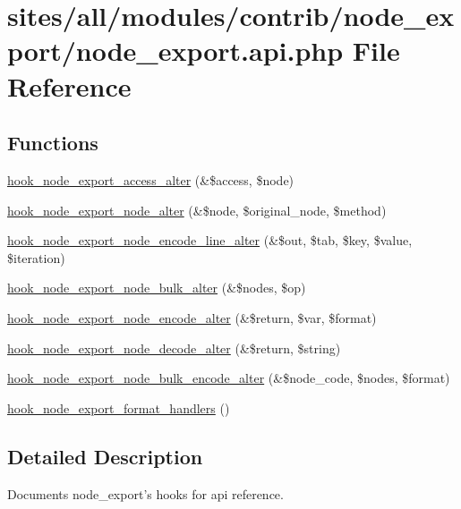 \hypertarget{node__export_8api_8php}{
\section{sites/all/modules/contrib/node\_\-export/node\_\-export.api.php File Reference}
\label{node__export_8api_8php}
}
\subsection*{Functions}
\begin{CompactItemize}
\item 
\hyperlink{node__export_8api_8php_07d300b1b84f51c8194ae2df7df69998}{hook\_\-node\_\-export\_\-access\_\-alter} (\&\$access, \$node)
\item 
\hyperlink{node__export_8api_8php_02844b873762538790439bc217d6e5de}{hook\_\-node\_\-export\_\-node\_\-alter} (\&\$node, \$original\_\-node, \$method)
\item 
\hyperlink{node__export_8api_8php_358549eb1b3bc10229c889721c180a51}{hook\_\-node\_\-export\_\-node\_\-encode\_\-line\_\-alter} (\&\$out, \$tab, \$key, \$value, \$iteration)
\item 
\hyperlink{node__export_8api_8php_231756420bcf1606865365dc50f65cbb}{hook\_\-node\_\-export\_\-node\_\-bulk\_\-alter} (\&\$nodes, \$op)
\item 
\hyperlink{node__export_8api_8php_aa3a7ad2886990335945a261e9d38793}{hook\_\-node\_\-export\_\-node\_\-encode\_\-alter} (\&\$return, \$var, \$format)
\item 
\hyperlink{node__export_8api_8php_faa4d0af455b099ef3b5072a440b3107}{hook\_\-node\_\-export\_\-node\_\-decode\_\-alter} (\&\$return, \$string)
\item 
\hyperlink{node__export_8api_8php_020d16d09246f3d732b7deea0fd7c0f4}{hook\_\-node\_\-export\_\-node\_\-bulk\_\-encode\_\-alter} (\&\$node\_\-code, \$nodes, \$format)
\item 
\hyperlink{node__export_8api_8php_5d50afbf83e9ecf288b67e47a6e32226}{hook\_\-node\_\-export\_\-format\_\-handlers} ()
\end{CompactItemize}


\subsection{Detailed Description}
Documents node\_\-export's hooks for api reference. 

